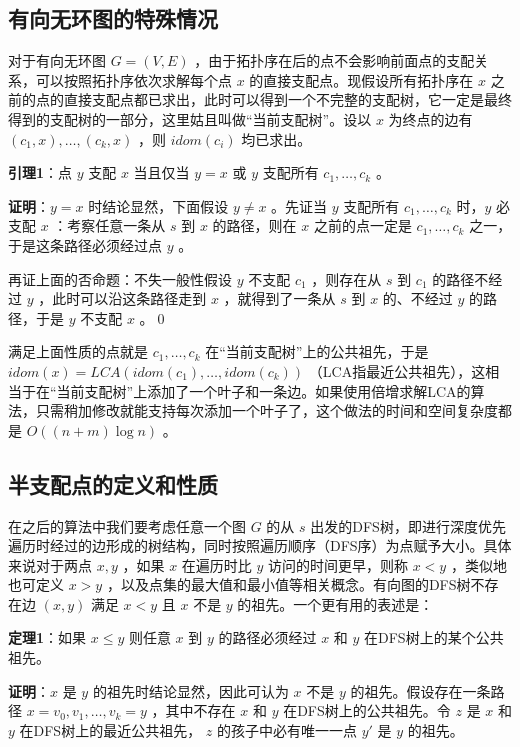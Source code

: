\documentclass{noithesis}
\begin{document}
\subsection{有向无环图的特殊情况}

对于有向无环图 $G = (V, E)$ ，由于拓扑序在后的点不会影响前面点的支配关系，可以按照拓扑序依次求解每个点 $x$ 的直接支配点。现假设所有拓扑序在 $x$ 之前的点的直接支配点都已求出，此时可以得到一个不完整的支配树，它一定是最终得到的支配树的一部分，这里姑且叫做“当前支配树”。设以 $x$ 为终点的边有 $(c_1,x),\dots,(c_k,x)$ ，则 $idom(c_i)$ 均已求出。

\textbf{引理1}：点 $y$ 支配 $x$ 当且仅当 $y=x$ 或 $y$ 支配所有 $c_1,\dots,c_k$ 。

\textbf{证明}：$y=x$ 时结论显然，下面假设 $y\neq x$ 。先证当 $y$ 支配所有 $c_1,\dots,c_k$ 时，$y$ 必支配 $x$ ：考察任意一条从 $s$ 到 $x$ 的路径，则在 $x$ 之前的点一定是 $c_1,\dots,c_k$ 之一，于是这条路径必须经过点 $y$ 。

再证上面的否命题：不失一般性假设 $y$ 不支配 $c_1$ ，则存在从 $s$ 到 $c_1$ 的路径不经过 $y$ ，此时可以沿这条路径走到 $x$ ，就得到了一条从 $s$ 到 $x$ 的、不经过 $y$ 的路径，于是 $y$ 不支配 $x$ 。\qed

满足上面性质的点就是 $c_1,\dots,c_k$ 在“当前支配树”上的公共祖先，于是 $idom(x)=LCA(idom(c_1), \dots, idom(c_k))$ （LCA指最近公共祖先），这相当于在“当前支配树”上添加了一个叶子和一条边。如果使用倍增求解LCA的算法，只需稍加修改就能支持每次添加一个叶子了，这个做法的时间和空间复杂度都是 $O((n+m)\log n)$ 。

\subsection{半支配点的定义和性质}

在之后的算法中我们要考虑任意一个图 $G$ 的从 $s$ 出发的DFS树，即进行深度优先遍历时经过的边形成的树结构，同时按照遍历顺序（DFS序）为点赋予大小。具体来说对于两点 $x,y$ ，如果 $x$ 在遍历时比 $y$ 访问的时间更早，则称 $x<y$ ，类似地也可定义 $x>y$ ，以及点集的最大值和最小值等相关概念。有向图的DFS树不存在边 $(x, y)$ 满足 $x<y$ 且 $x$ 不是 $y$ 的祖先。一个更有用的表述是：

\textbf{定理1}：如果 $x\le y$ 则任意 $x$ 到 $y$ 的路径必须经过 $x$ 和 $y$ 在DFS树上的某个公共祖先。

\textbf{证明}：$x$ 是 $y$ 的祖先时结论显然，因此可认为 $x$ 不是 $y$ 的祖先。假设存在一条路径 $x=v_0, v_1,\dots, v_k=y$ ，其中不存在 $x$ 和 $y$ 在DFS树上的公共祖先。令 $z$ 是 $x$ 和 $y$ 在DFS树上的最近公共祖先， $z$ 的孩子中必有唯一一点 $y'$ 是 $y$ 的祖先。
\end{document}
